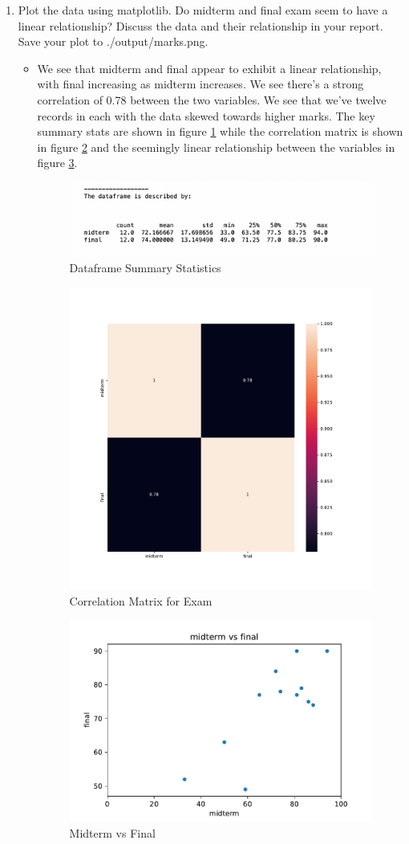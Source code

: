 \documentclass{scrreprt}
\begin{document}
\begin{enumerate}
	\item  Plot the data using matplotlib. Do midterm and final exam seem to have a linear relationship? Discuss the data and their relationship in your report. Save your plot to ./output/marks.png.
	\begin{itemize}
		\item We see that midterm and final appear to exhibit a linear relationship, with final increasing as midterm increases. We see there's a strong correlation of 0.78 between the two variables. We see that we've twelve records in each with the data skewed towards higher marks. The key summary stats are shown in figure \ref{stats} while the correlation matrix is shown in figure \ref{corr} and the seemingly linear relationship between the variables in figure \ref{q1a}.
		\begin{figure}[h!]
		\centering
		\includegraphics[width=0.7\linewidth]{exam_desc.png}
		\caption{Dataframe Summary Statistics}\label{stats}
		\end{figure}
	
		\begin{figure}[h!]
			\centering
			\includegraphics[width=0.5\linewidth]{exam_correlation_heatmap.png}
			\caption{Correlation Matrix for Exam}\label{corr}
		\end{figure}
			
			\begin{figure}[h!]
				\centering
				\includegraphics[width=0.5\linewidth]{marks.png}
				\caption{Midterm vs Final}\label{q1a}
			\end{figure}
	

\end{itemize}
\end{enumerate}
\end{document}
